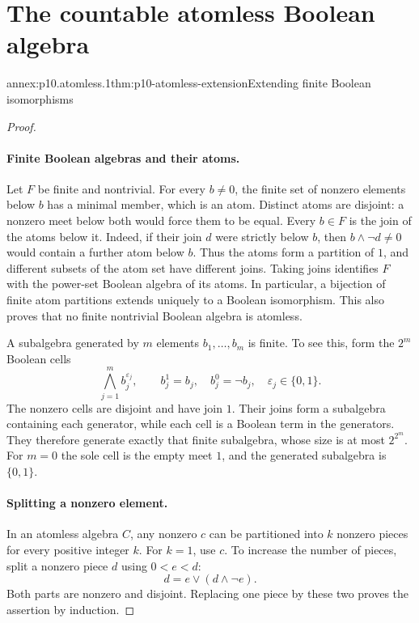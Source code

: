 
\section{The countable atomless Boolean algebra}

\begin{annexitem}{annex:p10.atomless.1}{thm:p10-atomless-extension}{Extending finite Boolean isomorphisms}
\begin{proof}
\paragraph{Finite Boolean algebras and their atoms.}
Let \(F\) be finite and nontrivial.
For every \(b\ne0\), the finite set of nonzero elements below \(b\)
has a minimal member, which is an atom.
Distinct atoms are disjoint: a nonzero meet below both would
force them to be equal.
Every \(b\in F\) is the join of the atoms below it.
Indeed, if their join \(d\) were strictly below \(b\), then
\(b\wedge\neg d\ne0\) would contain a further atom below \(b\).
Thus the atoms form a partition of \(1\), and different subsets
of the atom set have different joins.
Taking joins identifies \(F\) with the power-set Boolean algebra
of its atoms.
In particular, a bijection of finite atom partitions extends
uniquely to a Boolean isomorphism.
This also proves that no finite nontrivial Boolean algebra is atomless.

A subalgebra generated by \(m\) elements \(b_1,\ldots,b_m\) is
finite.  To see this, form the \(2^m\) Boolean cells
\[
 \bigwedge_{j=1}^m b_j^{\varepsilon_j},
 \qquad
 b_j^1=b_j,\quad b_j^0=\neg b_j,\quad
 \varepsilon_j\in\{0,1\}.
\]
The nonzero cells are disjoint and have join \(1\).
Their joins form a subalgebra containing each generator, while
each cell is a Boolean term in the generators.
They therefore generate exactly that finite subalgebra, whose
size is at most \(2^{2^m}\).
For \(m=0\) the sole cell is the empty meet \(1\), and the
generated subalgebra is \(\{0,1\}\).

\paragraph{Splitting a nonzero element.}
In an atomless algebra \(C\), any nonzero \(c\) can be partitioned
into \(k\) nonzero pieces for every positive integer \(k\).
For \(k=1\), use \(c\).
To increase the number of pieces, split a nonzero piece \(d\)
using \(0<e<d\):
\[
 d=e\vee(d\wedge\neg e).
\]
Both parts are nonzero and disjoint.
Replacing one piece by these two proves the assertion by induction.


\end{proof}
\end{annexitem}
